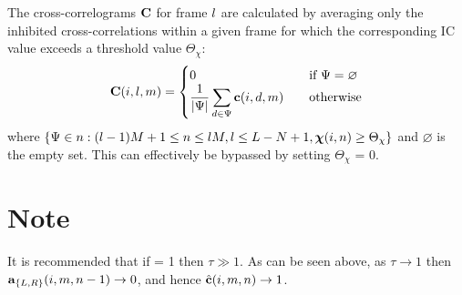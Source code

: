 \documentclass[10pt]{article}
\begin{document}
The cross-correlograms $\mathbf{C}$ for frame $l$ are calculated by averaging only the inhibited cross-correlations within a given frame for which the corresponding IC value exceeds a threshold value $\Theta_{\chi}$:
\begin{equation}
\mathbf{C}(i,l,m) = \begin{cases}
0 \quad &\text{if } \Psi=\varnothing\\
\displaystyle\frac{1}{\lvert\Psi\rvert}\sum_{d\in\Psi} \mathbf{c}(i,d,m) \quad &\text{otherwise}
\end{cases}
\end{equation}
where $\{\Psi\in n : (l-1)M+1\leq n\leq l M,l\leq L-N+1,\boldsymbol{\chi}(i,n) \geq \Theta_{\chi}\}$ and $\varnothing$ is the empty set. This can effectively be bypassed by setting $\Theta_\chi$ = 0.

\section*{Note}

It is recommended that if  = 1 then $\tau \gg 1$. As can be seen above, as $\tau\rightarrow1$ then $\mathbf{a}_{\{L,R\}}(i,m,n-1)\rightarrow0$, and hence $\hat{\mathbf{c}}(i,m,n)\rightarrow1$.
\end{document}
